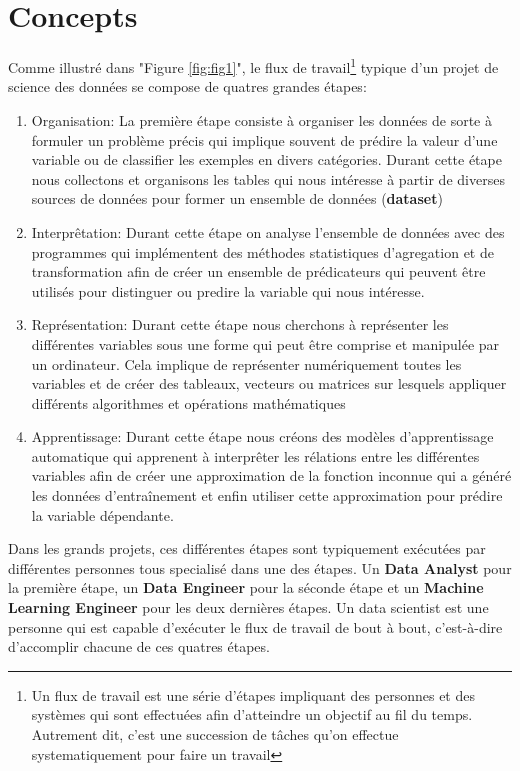 \section{Concepts}
\label{chap2.section2}
Comme illustré dans "Figure \ref{fig:fig1}", le flux de travail\footnote{Un flux de travail est une série d'étapes impliquant des personnes et des systèmes qui sont effectuées afin d'atteindre un objectif au fil du temps. Autrement dit, c'est une succession de tâches qu'on effectue systematiquement pour faire un travail} typique d'un projet de science des données se compose de quatres grandes étapes:

\begin{enumerate}
    \item Organisation: La première étape consiste à organiser les données de sorte à formuler un problème précis qui implique souvent de prédire la valeur d'une variable ou de classifier les exemples en divers catégories. Durant cette étape nous collectons et organisons les tables qui nous intéresse à partir de diverses sources de données pour former un ensemble de données (\textbf{dataset})
    \item Interprêtation: Durant cette étape on analyse l'ensemble de données avec des programmes qui implémentent des méthodes statistiques d'agregation et de transformation afin de créer un ensemble de prédicateurs qui peuvent être utilisés pour distinguer ou predire la variable qui nous intéresse.
    \item Représentation: Durant cette étape nous cherchons à représenter les différentes variables sous une forme qui peut être comprise et manipulée par un ordinateur. Cela implique de représenter numériquement toutes les variables et de créer des tableaux, vecteurs ou matrices sur lesquels appliquer différents algorithmes et opérations mathématiques
    \item Apprentissage: Durant cette étape nous créons des modèles d'apprentissage automatique qui apprenent à interprêter les rélations entre les différentes variables afin de créer une approximation de la fonction inconnue qui a généré les données d'entraînement et enfin utiliser cette approximation pour prédire la variable dépendante.
\end{enumerate}

Dans les grands projets, ces différentes étapes sont typiquement exécutées par différentes personnes tous specialisé dans une des étapes. Un \textbf{Data Analyst} pour la première étape, un \textbf{Data Engineer} pour la séconde étape et un \textbf{Machine Learning Engineer} pour les deux dernières étapes. Un data scientist est une personne qui est capable d'exécuter le flux de travail de bout à bout, c'est-à-dire d'accomplir chacune de ces quatres étapes.


